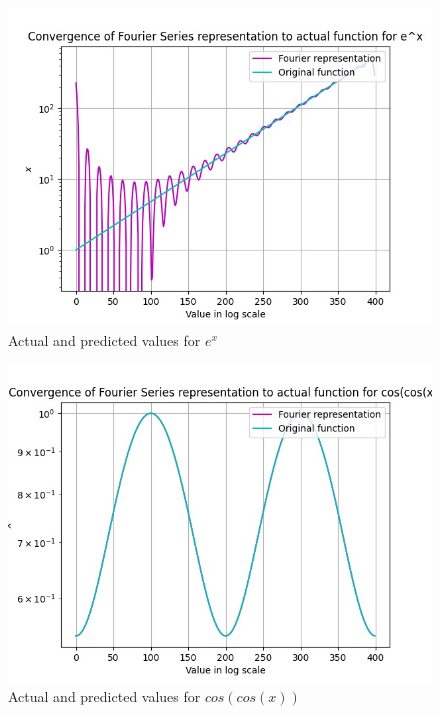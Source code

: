 \documentclass{article}
\begin{document}
\begin{figure}[!tbh]
    \centering
    \includegraphics[scale=0.7]{plots/Convergence of Fourier Series representation to actual function for e^x.jpg}
    \caption{Actual and predicted values for $e^x$}
    \label{fig:Figure 11}

    \end{figure}

\begin{figure}[!tbh]
    \centering
    \includegraphics[scale=0.7]{plots/Convergence of Fourier Series representation to actual function for cos(cos(x)).jpg}
    \caption{Actual and predicted values for $cos(cos(x))$}
    \label{fig:Figure 12}

    \end{figure}
\end{document}
